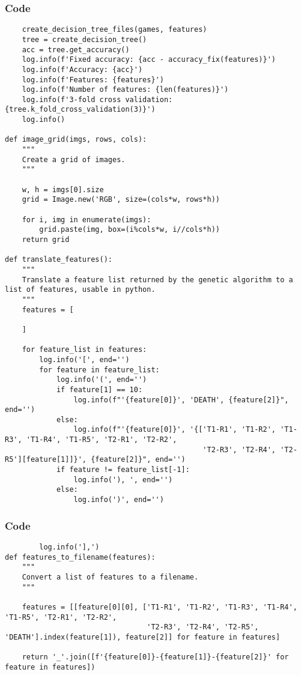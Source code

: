 \documentclass{beamer}
\begin{document}
\begin{frame}[fragile]
    \frametitle{Code}
    \fontsize{3pt}{5pt}\selectfont
    \begin{verbatim}
    create_decision_tree_files(games, features)
    tree = create_decision_tree()
    acc = tree.get_accuracy()
    log.info(f'Fixed accuracy: {acc - accuracy_fix(features)}')
    log.info(f'Accuracy: {acc}')
    log.info(f'Features: {features}')
    log.info(f'Number of features: {len(features)}')
    log.info(f'3-fold cross validation: {tree.k_fold_cross_validation(3)}')
    log.info()

def image_grid(imgs, rows, cols):
    """
    Create a grid of images.
    """

    w, h = imgs[0].size
    grid = Image.new('RGB', size=(cols*w, rows*h))
    
    for i, img in enumerate(imgs):
        grid.paste(img, box=(i%cols*w, i//cols*h))
    return grid

def translate_features():
    """
    Translate a feature list returned by the genetic algorithm to a list of features, usable in python.
    """
    features = [
        
    ]

    for feature_list in features:
        log.info('[', end='')
        for feature in feature_list:
            log.info('(', end='')
            if feature[1] == 10:
                log.info(f"'{feature[0]}', 'DEATH', {feature[2]}", end='')
            else:
                log.info(f"'{feature[0]}', '{['T1-R1', 'T1-R2', 'T1-R3', 'T1-R4', 'T1-R5', 'T2-R1', 'T2-R2',
                                              'T2-R3', 'T2-R4', 'T2-R5'][feature[1]]}', {feature[2]}", end='')                
            if feature != feature_list[-1]:
                log.info('), ', end='')
            else:
                log.info(')', end='')
    \end{verbatim}
\end{frame}

\begin{frame}[t, fragile]
    \frametitle{Code}
    \fontsize{3pt}{5pt}\selectfont
    \begin{verbatim}
        log.info('],')
def features_to_filename(features):
    """
    Convert a list of features to a filename.
    """

    features = [[feature[0][0], ['T1-R1', 'T1-R2', 'T1-R3', 'T1-R4', 'T1-R5', 'T2-R1', 'T2-R2',
                                 'T2-R3', 'T2-R4', 'T2-R5', 'DEATH'].index(feature[1]), feature[2]] for feature in features]

    return '_'.join([f'{feature[0]}-{feature[1]}-{feature[2]}' for feature in features])
    \end{verbatim}
\end{frame}
\end{document}
